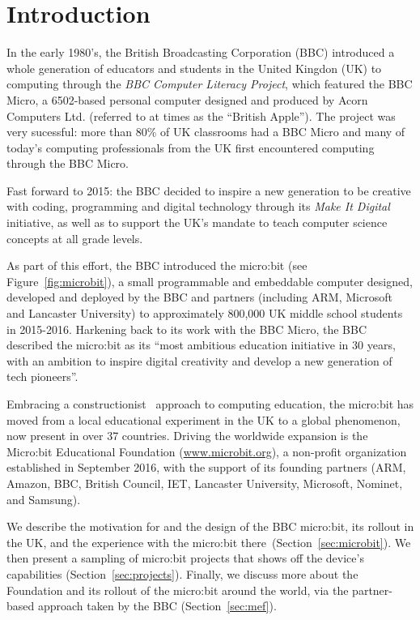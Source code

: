 \section{Introduction}
\label{sec:intrp}

In the early 1980's, the British Broadcasting Corporation (BBC)
introduced a whole generation of educators and students in the United Kingdon (UK)
to computing through the {\em BBC Computer Literacy Project}, which featured the BBC Micro,
a 6502-based personal computer designed and produced by Acorn Computers Ltd. (referred
to at times as the ``British Apple'').  The project was very sucessful:
more than 80\% of UK classrooms had a BBC Micro and many of today's
computing professionals from the UK first encountered computing through
the BBC Micro.~\cite{BBCMicro1982}

Fast forward to 2015: the BBC decided to inspire a new
generation to be creative with coding, programming and digital technology
through its {\em Make It Digital} initiative, as well as to support the UK's mandate to
teach computer science concepts at all grade levels.~\cite{PeytonJones2013ICFP}

As part of this effort, the BBC introduced the micro:bit (see
Figure~\ref{fig:microbit}),
a small programmable and embeddable computer designed,
developed and deployed by the BBC and partners (including ARM, Microsoft
and Lancaster University) to approximately 800,000 UK middle school students
in 2015-2016. Harkening back to its work with the BBC Micro,
the BBC described the micro:bit as its ``most ambitious education initiative in 30 years,
with an ambition to inspire digital creativity and
develop a new generation of tech pioneers''.~\cite{BBCwebsite}

Embracing a constructionist~\cite{Papert} approach to computing education, the micro:bit has moved from
a local educational experiment in the UK to a global phenomenon, now present in over 37 countries.
Driving the worldwide expansion is
the Micro:bit Educational Foundation (\url{www.microbit.org}),
a non-profit organization
established in September 2016, with the support of its founding partners (ARM,
Amazon, BBC, British Council, IET, Lancaster University, Microsoft,
Nominet, and Samsung).

We describe the motivation for and the design of the BBC micro:bit, its
rollout in the UK, and the experience with the micro:bit there~(Section~\ref{sec:microbit}).
We then present a sampling of micro:bit projects that
shows off the device's capabilities (Section~\ref{sec:projects}). Finally, 
we discuss more about the Foundation and its rollout of the micro:bit around the world, 
via the partner-based approach taken by the BBC (Section~\ref{sec:mef}).

